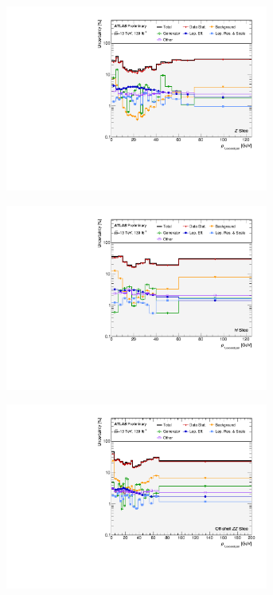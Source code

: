 \begin{figure}[hp]
    \centering
    \begin{subfigure}{.49\textwidth}\centering\includegraphics[width = 0.95\textwidth]{Figures/m4l/Systematics/Unfolded/UnfoldedSys_pt34_vs_M4l_Stack_Paper0.pdf}\end{subfigure}
    \begin{subfigure}{.49\textwidth}\centering\includegraphics[width = 0.95\textwidth]{Figures/m4l/Systematics/Unfolded/UnfoldedSys_pt34_vs_M4l_Stack_Paper1.pdf}\end{subfigure}
    \begin{subfigure}{.49\textwidth}\centering\includegraphics[width = 0.95\textwidth]{Figures/m4l/Systematics/Unfolded/UnfoldedSys_pt34_vs_M4l_Stack_Paper2.pdf}\end{subfigure}

\end{figure}
